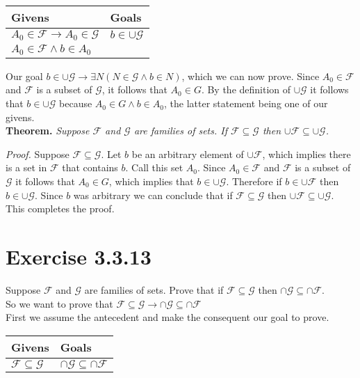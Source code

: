 \documentclass{article}
\newcommand{\n}{ \noindent }
\newcommand{\F}{\mathcal{F}}
\newcommand{\G}{\mathcal{G}}
\begin{document}
\begin{table}[h]
\begin{tabular}{ll}
\hline
Givens & Goals   \\ \hline
$A_{0} \in \F \rightarrow A_{0} \in \G$ & $b \in \cup \G$  \\
$A_{0} \in \F \wedge b \in A_{0}$ & \\ \hline
\end{tabular}
\end{table}

\n Our goal $b \in \cup \G \rightarrow \exists N (N \in \G \wedge b \in N)$, which we can now prove. Since $A_{0} \in \F$ and $\F$ is a subset of $\G$, it follows that $A_{0} \in G$. By the definition of $\cup \G$ it follows that $b \in \cup \G$ because $A_{0} \in G \wedge b \in A_{0}$, the latter statement being one of our givens. \\


\n \textbf{Theorem.} \textit{Suppose $\F$ and $\G$ are families of sets. If $\F \subseteq \G$ then 
$\cup \F \subseteq \cup \G$.}

\n \textit{Proof.} Suppose $\F \subseteq \G$. Let $b$ be an arbitrary element of $\cup \F$, which implies there is a set in $\mathcal{F}$ that contains $b$. Call this set $A_{0}$. Since $A_{0} \in \F$ and $\F$ is a subset of $\G$ it follows that $A_{0} \in G$, which implies that $b \in \cup \G$. Therefore if $b \in \cup \F$ then $b \in \cup \G$. Since $b$ was arbitrary we can conclude that if $\F \subseteq \G$ then $\cup \F \subseteq \cup \G$. This completes the proof.


\section*{Exercise 3.3.13}
\n Suppose $\F$ and $\G$ are families of sets. Prove that if $\F \subseteq \G$ then 
$\cap \G \subseteq \cap \F$. \\

\n So we want to prove that 
$\F \subseteq \G \rightarrow \cap \G \subseteq \cap \F$ \\

\n First we assume the antecedent and make the consequent our goal to prove.

\begin{table}[h]
\begin{tabular}{ll}
\hline
Givens & Goals   \\ \hline
$\F \subseteq \G$ & $\cap \G \subseteq \cap \F$   \\ \hline
\end{tabular}
\end{table}
\end{document}
